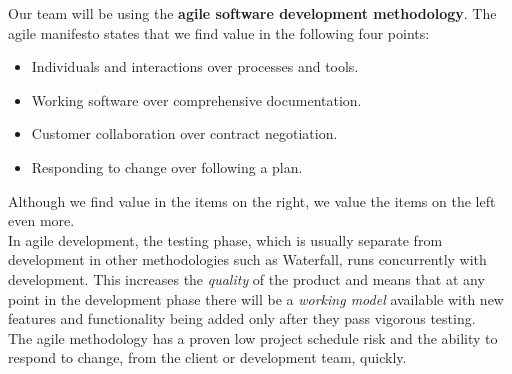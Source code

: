 \begin{flushleft}
Our team will be using the \textbf{agile software development methodology}. The agile manifesto states that we find value in the following four points:\\
\begin{itemize}
	\item Individuals and interactions over processes and tools.
	\item Working software over comprehensive documentation.
	\item Customer collaboration over contract negotiation.
	\item Responding to change over following a plan.
\end{itemize}
Although we find value in the items on the right, we value the items on the left even more.\\
In agile development, the testing phase, which is usually separate from development in other methodologies such as Waterfall, runs concurrently with development. This increases the \emph{quality} of the product and means that at any point in the development phase there will be a \emph{working model} available with new features and functionality being added only after they pass vigorous testing.\\
The agile methodology has a proven low project schedule risk and the ability to respond to change, from the client or development team, quickly.
\end{flushleft}